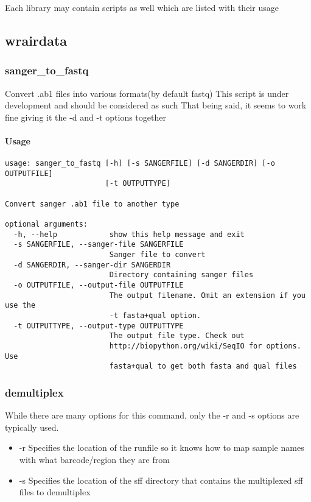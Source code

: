 \documentclass{article}
\begin{document}
Each library may contain scripts as well which are listed with their usage

\subsection{wrairdata}

\subsubsection{sanger\_to\_fastq}
Convert .ab1 files into various formats(by default fastq)
This script is under development and should be considered as such
That being said, it seems to work fine giving it the -d and -t options together

\paragraph{Usage}

\begin{lstlisting}
usage: sanger_to_fastq [-h] [-s SANGERFILE] [-d SANGERDIR] [-o OUTPUTFILE]
                       [-t OUTPUTTYPE]

Convert sanger .ab1 file to another type

optional arguments:
  -h, --help            show this help message and exit
  -s SANGERFILE, --sanger-file SANGERFILE
                        Sanger file to convert
  -d SANGERDIR, --sanger-dir SANGERDIR
                        Directory containing sanger files
  -o OUTPUTFILE, --output-file OUTPUTFILE
                        The output filename. Omit an extension if you use the
                        -t fasta+qual option.
  -t OUTPUTTYPE, --output-type OUTPUTTYPE
                        The output file type. Check out
                        http://biopython.org/wiki/SeqIO for options. Use
                        fasta+qual to get both fasta and qual files
\end{lstlisting}

\subsubsection{demultiplex}
While there are many options for this command, only the -r and -s options are typically used.
\begin{itemize}
 \item -r Specifies the location of the runfile so it knows how to map sample names with what barcode/region they are from
 \item -s Specifies the location of the sff directory that contains the multiplexed sff files to demultiplex
\end{itemize}
\end{document}
